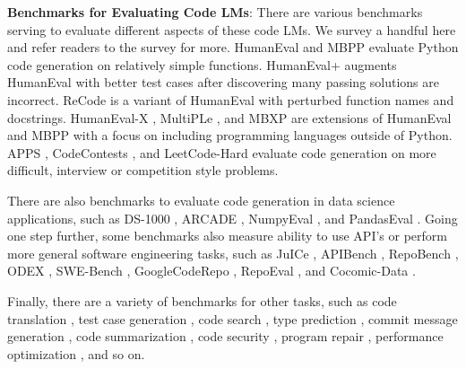 \documentclass{article}
\begin{document}
\noindent \textbf{Benchmarks for Evaluating Code LMs}: There are various benchmarks serving to evaluate different aspects of these code LMs. We survey a handful here and refer readers to the survey \citep{zhang2023survey} for more. HumanEval \citep{chen2021evaluating} and MBPP \citep{austin2021program} evaluate Python code generation on relatively simple functions. HumanEval+ \citep{liu2023your} augments HumanEval with better test cases after discovering many passing solutions are incorrect. ReCode \citep{wang2022recode} is a variant of HumanEval with perturbed function names and docstrings. HumanEval-X  \citep{zheng2023codegeex}, MultiPLe \citep{cassano2022multipl}, and MBXP \citep{athiwaratkun2022multi} are extensions of HumanEval and MBPP with a focus on including programming languages outside of Python. APPS \citep{hendrycks2021measuring}, CodeContests \citep{li2022competition}, and LeetCode-Hard \citep{shinn2023reflexion} evaluate code generation on more difficult, interview or competition style problems.

There are also benchmarks to evaluate code generation in data science applications, such as DS-1000 \citep{lai2023ds}, ARCADE \citep{yin2022natural}, NumpyEval \citep{zhang2023toolcoder}, and PandasEval \citep{jain2022jigsaw}. Going one step further, some benchmarks also measure ability to use API's or perform more general software engineering tasks, such as JuICe \citep{agashe2019juice}, APIBench \citep{patil2023gorilla}, RepoBench \citep{liu2023repobench}, ODEX \citep{wang2022execution}, SWE-Bench \citep{jimenez2023swe}, GoogleCodeRepo \citep{shrivastava2023repository}, RepoEval \citep{zhang2023repocoder}, and Cocomic-Data \citep{ding2022cocomic}.

Finally, there are a variety of benchmarks for other tasks, such as code translation \citep{roziere2020unsupervised, zhu2022xlcost, ahmad-etal-2021-avatar}, test case generation \citep{tufano2022methods2test, watson2020learning}, code search \citep{husain2019codesearchnet}, type prediction \citep{mir2022type4py, wei2023typet5, malik2019nl2type}, commit message generation \citep{liu2020atom}, code summarization \citep{leclair2019neural, iyer2016summarizing, barone2017parallel, hasan2021codesc, alon2018code2seq}, code security \citep{liguori2022can, pearce2022asleep, tony2023llmseceval}, program repair \citep{jiang2023impact, xia2022practical, tufano2019empirical, haque2022fixeval, jin2023inferfix, gupta2017deepfix, berabi2021tfix}, performance optimization \citep{garg2022deepperf, madaan2023learning}, and so on.
\end{document}
